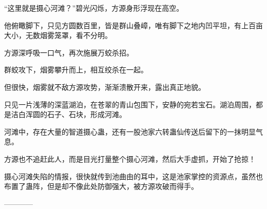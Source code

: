 \begin{this_body}
“这里就是摄心河滩？”碧光闪烁，方源身形浮现在高空。

他俯瞰脚下，只见方圆数百里，皆是群山叠嶂，唯有脚下之地内凹平坦，有上百亩大小，无数烟雾笼罩，看不分明。

方源深呼吸一口气，再次施展万蛟杀招。

群蛟攻下，烟雾攀升而上，相互绞杀在一起。

但很快，烟雾就不敌方源攻势，渐渐溃散开来，露出真正地貌。

只见一片浅薄的深蓝湖泊，在苍翠的青山包围下，安静的宛若宝石。湖泊周围，都是洁白浑圆的石子、石块，形成河滩。

河滩中，存在大量的智道摄心蛊，还有一股池家六转蛊仙传送后留下的一抹明显气息。

方源也不追赶此人，而是目光打量整个摄心河滩，然后大手虚抓，开始了抢掠！

摄心河滩失陷的情报，很快就传到池曲由的耳中，这是池家掌控的资源点，虽然也布置了蛊阵，但是却不像此处防御强大，被方源攻破而得手。

------------

\end{this_body}


